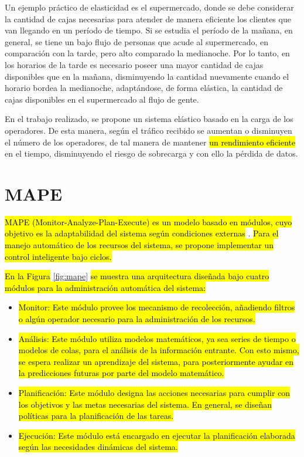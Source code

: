 Un ejemplo práctico de elasticidad es el supermercado, donde se debe considerar la cantidad de cajas necesarias para atender de manera eficiente los clientes que van llegando en un período de tiempo. Si se estudia el período de la mañana, en general, se tiene un bajo flujo de personas que acude al supermercado, en comparación con la tarde, pero alto comparado la medianoche. Por lo tanto, en los horarios de la tarde es necesario poseer una mayor cantidad de cajas disponibles que en la mañana, disminuyendo la cantidad nuevamente cuando el horario bordea la medianoche, adaptándose, de forma elástica, la cantidad de cajas disponibles en el supermercado al flujo de gente.

En el trabajo realizado, se propone un sistema elástico basado en la carga de los operadores. De esta manera, según el tráfico recibido se aumentan o disminuyen el número de los operadores, de tal manera de mantener \hl{un rendimiento eficiente} en el tiempo, disminuyendo el riesgo de sobrecarga y con ello la pérdida de datos.

\section{MAPE}
\label{sec:MAPE}
\hl{MAPE (Monitor-Analyze-Plan-Execute) es un modelo basado en módulos, cuyo objetivo es la adaptabilidad del sistema según condiciones externas} \citep{ibm2005architectural}. \hl{Para el manejo automático de los recursos del sistema, se propone implementar un control inteligente bajo ciclos.}

\hl{En la Figura} \ref{fig:mape} \hl{se muestra una arquitectura diseñada bajo cuatro módulos para la administración automática del sistema:}

\begin{itemize}
	\item \hl{Monitor: Este módulo provee los mecanismo de recolección, añadiendo filtros o algún operador necesario para la administración de los recursos.}
	\item \hl{Análisis: Este módulo utiliza modelos matemáticos, ya sea series de tiempo o modelos de colas, para el análisis de la información entrante. Con esto mismo, se espera realizar un aprendizaje del sistema, para posteriormente ayudar en la predicciones futuras por parte del modelo matemático.}
	\item \hl{Planificación: Este módulo designa las acciones necesarias para cumplir con los objetivos y las metas necesarias del sistema. En general, se diseñan políticas para la planificación de las tareas.}
	\item \hl{Ejecución: Este módulo está encargado en ejecutar la planificación elaborada según las necesidades dinámicas del sistema.}
\end{itemize}

